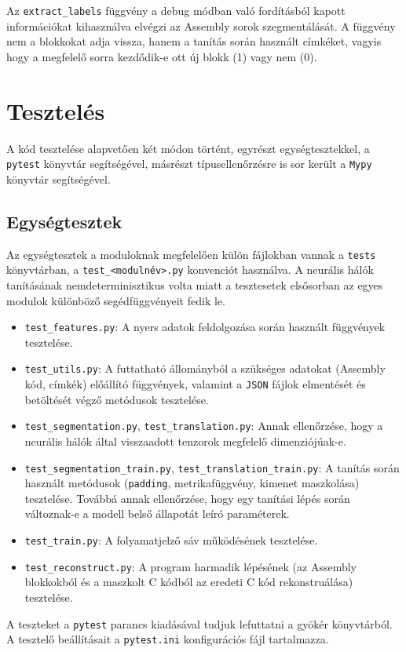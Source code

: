 Az \texttt{extract\_labels} függvény a debug módban való fordításból kapott információkat kihasználva
elvégzi az Assembly sorok szegmentálását. A függvény nem a blokkokat adja vissza, hanem a tanítás során
használt címkéket, vagyis hogy a megfelelő sorra kezdődik-e ott új blokk (1) vagy nem (0).

\section{Tesztelés}
A kód tesztelése alapvetően két módon történt, egyrészt egységtesztekkel, a
\texttt{pytest}\cite{pytest7.1} könyvtár segítségével, másrészt típusellenőrzésre is sor került
a \texttt{Mypy}\cite{mypy} könyvtár segítségével.

\subsection{Egységtesztek}
Az egységtesztek a moduloknak megfelelően külön
fájlokban vannak a \texttt{tests} könyvtárban, a \texttt{test\_<modulnév>.py} konvenciót használva.
A neurális hálók tanításának nemdeterminisztikus volta miatt a tesztesetek elsősorban az egyes modulok
különböző segédfüggvényeit fedik le.
\begin{itemize}
    \item \texttt{test\_features.py}: A nyers adatok feldolgozása során használt függvények tesztelése.
    \item \texttt{test\_utils.py}: A futtatható állományból a szükséges adatokat (Assembly kód, címkék)
        előállító függvények, valamint a \texttt{JSON} fájlok elmentését és betöltését végző metódusok
        tesztelése.
    \item \texttt{test\_segmentation.py}, \texttt{test\_translation.py}: Annak ellenőrzése, hogy a neurális hálók
        által visszaadott tenzorok megfelelő dimenziójúak-e.
    \item \texttt{test\_segmentation\_train.py}, \texttt{test\_translation\_train.py}: A tanítás során használt
        metódusok (\texttt{padding}, metrikafüggvény, kimenet maszkolása) tesztelése. Továbbá annak ellenőrzése,
        hogy egy tanítási lépés során változnak-e a modell belső állapotát leíró paraméterek.
    \item \texttt{test\_train.py}: A folyamatjelző sáv működésének tesztelése.
    \item \texttt{test\_reconstruct.py}: A program harmadik lépésének (az Assembly blokkokból és a 
        maszkolt C kódból az eredeti C kód rekonstruálása) tesztelése.
\end{itemize}
A teszteket a \texttt{pytest} parancs kiadásával tudjuk lefuttatni
a gyökér könyvtárból. A tesztelő beállításait a \texttt{pytest.ini} konfigurációs fájl tartalmazza.

